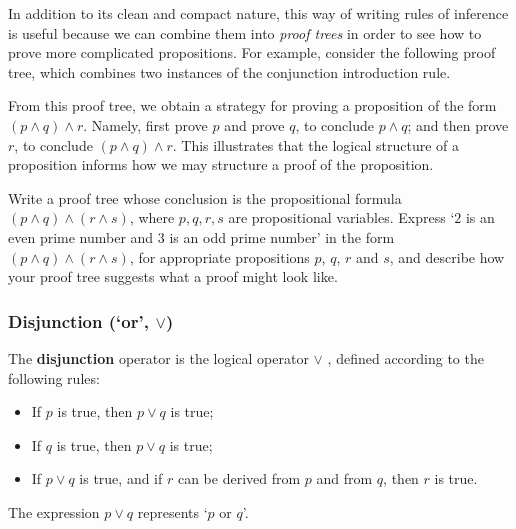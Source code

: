 In addition to its clean and compact nature, this way of writing rules of inference is useful because we can combine them into \textit{proof trees} in order to see how to prove more complicated propositions. For example, consider the following proof tree, which combines two instances of the conjunction introduction rule.

\begin{center}
\begin{prooftree}
\end{prooftree}
\end{center}

From this proof tree, we obtain a strategy for proving a proposition of the form $(p \wedge q) \wedge r$. Namely, first prove $p$ and prove $q$, to conclude $p \wedge q$; and then prove $r$, to conclude $(p \wedge q) \wedge r$. This illustrates that the logical structure of a proposition informs how we may structure a proof of the proposition.

\begin{exercise}
Write a proof tree whose conclusion is the propositional formula $(p \wedge q) \wedge (r \wedge s)$, where $p,q,r,s$ are propositional variables. Express `$2$ is an even prime number and $3$ is an odd prime number' in the form $(p \wedge q) \wedge (r \wedge s)$, for appropriate propositions $p$, $q$, $r$ and $s$, and describe how your proof tree suggests what a proof might look like.
\end{exercise}

\subsubsection*{Disjunction (`or', $\vee$)}

\begin{idefinition}
\label{defDisjunction}
The \textbf{disjunction} operator is the logical operator $\vee$ , defined according to the following rules:
\begin{itemize}
\item {} If $p$ is true, then $p \vee q$ is true;
\item {} If $q$ is true, then $p \vee q$ is true;
\item \elimrule{\vee} If $p \vee q$ is true, and if $r$ can be derived from $p$ and from $q$, then $r$ is true.
\end{itemize}
The expression $p \vee q$ represents `$p$ or $q$'.
\end{idefinition}

